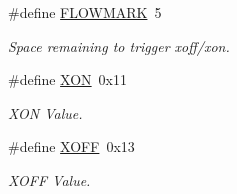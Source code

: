 \begin{DoxyCompactItemize}
\#define \hyperlink{group__uart_gaa7907a070ef8e6d68d7d774b34eebe66}{F\-L\-O\-W\-M\-A\-R\-K}~5
\begin{DoxyCompactList}\small\item\em Space remaining to trigger xoff/xon. \end{DoxyCompactList}\item 
\#define \hyperlink{group__uart_gacdf721774c51e08c6609e6fa8cf82cc9}{X\-O\-N}~0x11
\begin{DoxyCompactList}\small\item\em X\-O\-N Value. \end{DoxyCompactList}\item 
\#define \hyperlink{group__uart_ga67fd78ae15d2b67c10d44d69a49ab1c5}{X\-O\-F\-F}~0x13
\begin{DoxyCompactList}\small\item\em X\-O\-F\-F Value. \end{DoxyCompactList}\end{DoxyCompactItemize}
